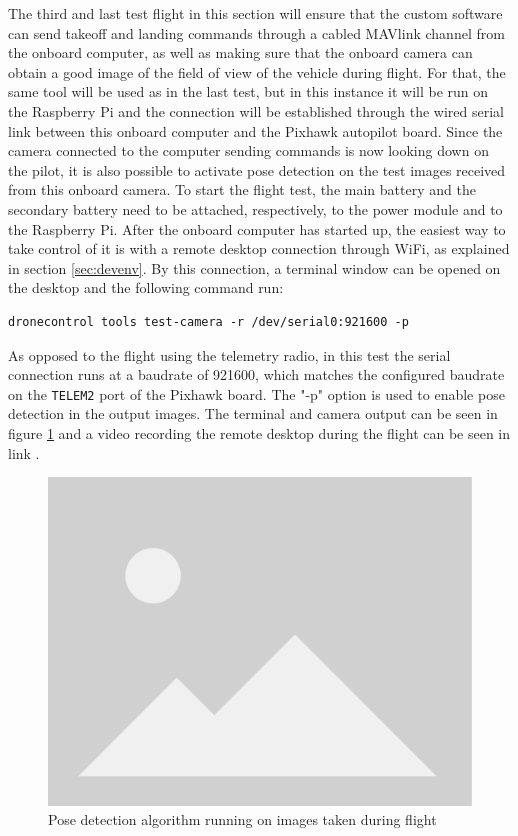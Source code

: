 The third and last test flight in this section will ensure that the custom software can send takeoff and landing commands through a cabled MAVlink channel from the onboard computer,
as well as making sure that the onboard camera can obtain a good image of the field of view of the vehicle during flight.
For that, the same tool will be used as in the last test, 
but in this instance it will be run on the Raspberry Pi and the connection will be established through the wired serial link between this onboard computer and the Pixhawk autopilot board.
Since the camera connected to the computer sending commands is now looking down on the pilot, it is also possible to activate pose detection on the test images received from this onboard camera.
To start the flight test, the main battery and the secondary battery need to be attached, respectively, to the power module and to the Raspberry Pi.
After the onboard computer has started up, the easiest way to take control of it is with a remote desktop connection through WiFi, as explained in section \ref{sec:devenv}.
By this connection, a terminal window can be opened on the desktop and the following command run:
\begin{verbatim}
dronecontrol tools test-camera -r /dev/serial0:921600 -p
\end{verbatim}
As opposed to the flight using the telemetry radio, in this test the serial connection runs at a baudrate of 921600, which matches the configured baudrate on the \texttt{TELEM2} port of the Pixhawk board.
The "-p" option is used to enable pose detection in the output images.
The terminal and camera output can be seen in figure \ref{fig:flight-test-cam-onboard} and a video recording the remote desktop during the flight can be seen in link .


\begin{figure}
  \centering
  \includegraphics[width=.6\textwidth, keepaspectratio]{img/placeholder.png}
  \caption{Pose detection algorithm running on images taken during flight}\label{fig:flight-test-cam-onboard}
\end{figure}


